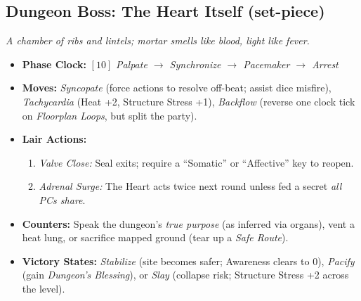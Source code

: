 \subsection*{Dungeon Boss: The Heart Itself (set-piece)}
\label{sec:dungeon-heart-boss}
\textit{A chamber of ribs and lintels; mortar smells like blood, light like fever.}
\begin{itemize}
  \item \textbf{Phase Clock:} \([10]\) \emph{Palpate \(\rightarrow\) Synchronize \(\rightarrow\) Pacemaker \(\rightarrow\) Arrest}
  \item \textbf{Moves:} \emph{Syncopate} (force actions to resolve off-beat; assist dice misfire), \emph{Tachycardia} (Heat +2, Structure Stress +1), \emph{Backflow} (reverse one clock tick on \emph{Floorplan Loops}, but split the party).
  \item \textbf{Lair Actions:}
  \begin{enumerate}\item \emph{Valve Close:} Seal exits; require a “Somatic” or “Affective” key to reopen.\item \emph{Adrenal Surge:} The Heart acts twice next round unless fed a secret \emph{all PCs share}. \end{enumerate}
  \item \textbf{Counters:} Speak the dungeon’s \emph{true purpose} (as inferred via organs), vent a heat lung, or sacrifice mapped ground (tear up a \emph{Safe Route}).
  \item \textbf{Victory States:} \emph{Stabilize} (site becomes safer; Awareness clears to 0), \emph{Pacify} (gain \emph{Dungeon’s Blessing}), or \emph{Slay} (collapse risk; Structure Stress +2 across the level).
\end{itemize}